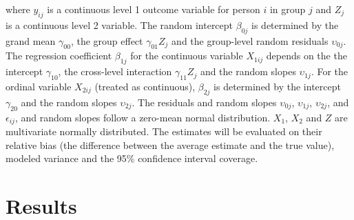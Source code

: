 \documentclass[10pt, a4paper, titlepage]{article}
\begin{document}
where $y_{ij}$ is a continuous level 1 outcome variable for person $i$ in group $j$ and $Z_j$ is a continuous level 2 variable. The random intercept $\beta_{0j}$ is determined by the grand mean $\gamma_{00}$, the group effect $\gamma_{01}Z_{j}$ and the group-level random residuals $\upsilon_{0j}$. The regression coefficient $\beta_{1j}$ for the continuous variable $X_{1ij}$ depends on the the intercept $\gamma_{10}$, the cross-level interaction $\gamma_{11}Z_{j}$ and the random slopes $\upsilon_{1j}$. For the ordinal variable $X_{2ij}$ (treated as continuous), $\beta_{2j}$ is determined by the intercept $\gamma_{20}$ and the random slopes $\upsilon_{2j}$. The residuals and random slopes $\upsilon_{0j}$, $\upsilon_{1j}$,  $\upsilon_{2j}$, and $\epsilon_{ij}$, and random slopes follow a zero-mean normal distribution. $X_1$, $X_2$ and $Z$ are multivariate normally distributed. The estimates will be evaluated on their relative bias (the difference between the average estimate and the true value), modeled variance and the 95\% confidence interval coverage.

\section{Results}

\nocite{*}
\newpage


\end{document}
